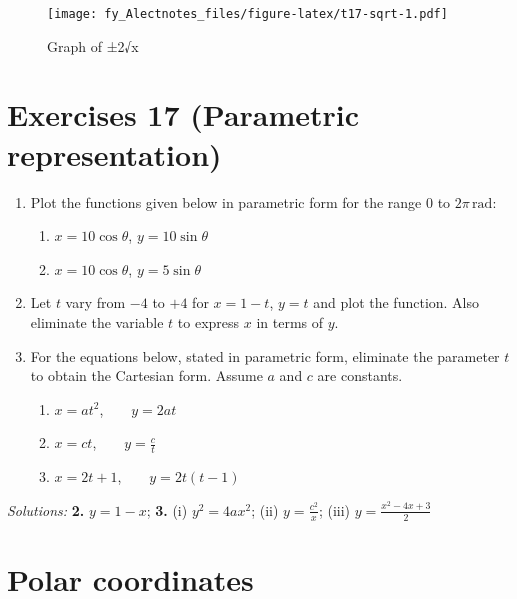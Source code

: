 \documentclass[
  12pt,
  oneside]{book}
\providecommand{\tightlist}{%
  \setlength{\itemsep}{0pt}\setlength{\parskip}{0pt}}
\theoremstyle{definition}
\theoremstyle{definition}
\theoremstyle{definition}
\theoremstyle{definition}
\theoremstyle{remark}
\begin{document}
\begin{figure}
\centering
\texttt{[image: fy\_Alectnotes\_files/figure-latex/t17-sqrt-1.pdf]}
\caption{\label{fig:t17-sqrt}Graph of ±2√x}
\end{figure}

\hypertarget{exercises-17-parametric-representation}{%
\chapter*{Exercises 17 (Parametric representation)}\label{exercises-17-parametric-representation}}

\begin{enumerate}
\def\labelenumi{\arabic{enumi}.}
\item
  Plot the functions given below in parametric form for the range \(0\) to \(2\pi\,\mathrm{rad}\):

  \begin{enumerate}
  \def\labelenumii{\roman{enumii})}
  \tightlist
  \item
    \(x = 10\cos\theta\), \(y = 10\sin\theta\)
  \item
    \(x = 10\cos\theta\), \(y = 5\sin\theta\)
  \end{enumerate}
\item
  Let \(t\) vary from \(-4\) to \(+4\) for \(x = 1 - t\), \(y = t\) and plot the function. Also eliminate the variable \(t\) to express \(x\) in terms of \(y\).
\item
  For the equations below, stated in parametric form, eliminate the parameter \(t\) to obtain the Cartesian form. Assume \(a\) and \(c\) are constants.

  \begin{enumerate}
  \def\labelenumii{\roman{enumii})}
  \tightlist
  \item
    \(x = at^2\), ~ ~ \(y = 2at\)
  \item
    \(x = ct\), ~ ~ \(y=\frac{c}{t}\)
  \item
    \(x = 2t + 1\), ~ ~ \(y = 2t(t - 1)\)
  \end{enumerate}
\end{enumerate}

\emph{Solutions:}
\textbf{2.} \(y=1-x\);
\textbf{3.} (i) \(y^2=4ax^2\);
(ii) \(y=\frac{c^2}{x}\);
(iii) \(y=\frac{x^2-4x+3}{2}\)

\hypertarget{polar-coordinates}{%
\chapter{Polar coordinates}\label{polar-coordinates}}
\end{document}
